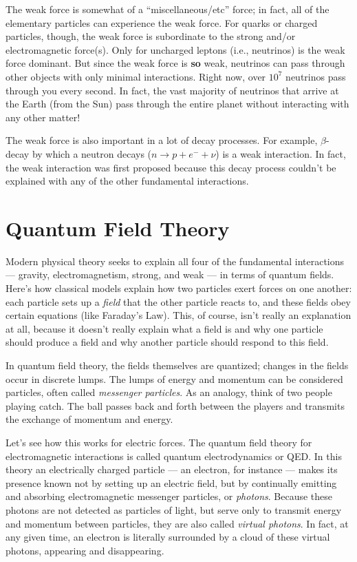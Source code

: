 The weak force is somewhat of a ``miscellaneous/etc'' force; in
fact, all of the elementary particles can experience the weak
force.  For quarks or charged particles, though, the weak force is
subordinate to the strong and/or electromagnetic force(s).  Only
for uncharged leptons (i.e., neutrinos) is the weak force
dominant.  But since the weak force is {\bf so} weak, neutrinos
can pass through other objects with only minimal interactions.
Right now, over $10^7$ neutrinos pass through you every second. In
fact, the vast majority of neutrinos that arrive at the Earth
(from the Sun) pass through the entire planet without interacting
with any other matter!

The weak force is also important in a lot of decay processes. For
example, $\beta$-decay by which a neutron decays ($n \rightarrow p
+ e^- + \nu$) is a weak interaction.  In fact, the weak
interaction was first proposed because this decay process couldn't
be explained with any of the other fundamental interactions.

\section{Quantum Field Theory}

Modern physical theory seeks to explain all four of the
fundamental interactions --- gravity, electromagnetism, strong,
and weak --- in terms of quantum fields.  Here's how classical
models explain how two particles exert forces on one another: each
particle sets up a {\em field} that the other particle reacts to,
and these fields obey certain equations (like Faraday's Law).
This, of course, isn't really an explanation at all, because it
doesn't really explain what a field is and why one particle should
produce a field and why another particle should respond to this
field.

In quantum field theory, the fields themselves are quantized;
changes in the fields occur in discrete lumps.  The lumps of
energy and momentum can be considered particles, often called {\em
messenger particles}.  As an analogy, think of two people playing
catch.  The ball passes back and forth between the players and
transmits the exchange of momentum and energy.

Let's see how this works for electric forces.  The quantum field
theory for electromagnetic interactions is called quantum
electrodynamics or QED.  In this theory an electrically charged
particle --- an electron, for instance --- makes its presence
known not by setting up an electric field, but by continually
emitting and absorbing electromagnetic messenger particles, or
{\em photons}. Because these photons are not detected as particles
of light, but serve only to transmit energy and momentum between
particles, they are also called {\em virtual photons}.  In fact,
at any given time, an electron is literally surrounded by a cloud
of these virtual photons, appearing and disappearing.

